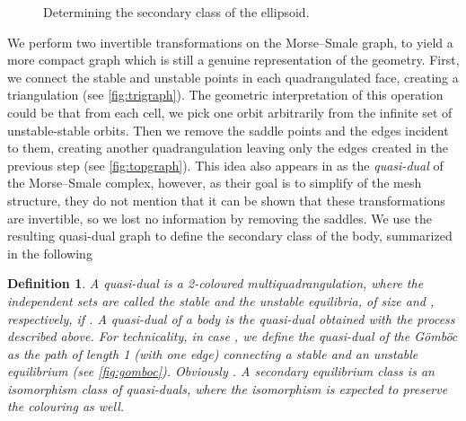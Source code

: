 \documentclass[]{article}
\newtheorem{defn}{Definition}
\newcommand{\Gomboc}{Gömböc\xspace}
\begin{document}
\begin{figure}
\centering
{}
\caption{Determining the secondary class of the ellipsoid.
}
  \label{fig:subclass}
\end{figure}

We perform two invertible transformations on the Morse--Smale graph, to yield a more compact graph which is still a genuine representation of the geometry.
First, we connect the stable and unstable points in each quadrangulated face, creating a triangulation (see \autoref{fig:trigraph}).
The geometric interpretation of this operation could be that from each cell, we pick one orbit arbitrarily from the infinite set of unstable-stable orbits.
Then we remove the saddle points and the edges incident to them, creating another quadrangulation leaving only the edges created in the previous step (see \autoref{fig:topgraph}).
This idea also appears in \cite{Dong2006} as the \emph{quasi-dual} of the Morse--Smale complex, however, as their goal is to simplify of the mesh structure, they do not mention that it can be shown that these transformations are invertible, so we lost no information by removing the saddles.
We use the resulting quasi-dual graph to define the secondary class of the body, summarized in the following

\begin{defn}
A \emph{quasi-dual} is a 2-coloured multiquadrangulation, where the independent sets are called the stable and the unstable equilibria, of size  and , respectively, if .
  A \emph{quasi-dual of a body} is the quasi-dual obtained with the process described above.
  For technicality, in case , we define the quasi-dual of the \Gomboc as the path  of length 1 (with one edge) connecting a stable and an unstable equilibrium (see \autoref{fig:gomboc}).
  Obviously .
  A \emph{secondary equilibrium class} is an isomorphism class of quasi-duals, where the isomorphism is expected to preserve the colouring as well.
\end{defn}
\end{document}
